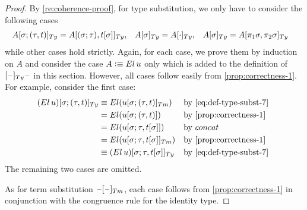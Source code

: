 \documentclass[a4paper,UKenglish,numberwithinsect,cleveref,thm-restate]{lipics-v2021}
\begin{document}
\propCoherence*
\begin{proof}
  By \cref{re:coherence-proof}, for type substitution, we only have to consider the following cases 
  \begin{align*}
    \subTy{A}{\sigma; (\tau, t)}    & = \subTy{A}{(\sigma;\tau), \sub{t}{\sigma}},
                                     & \subTy{A}{\sigma}               & = \subTy{A}{\emptyctx},
                                     & \subTy{A}{\sigma}               & = \subTy{A}{\pi_1\sigma, \pi_2\sigma}
  \end{align*}
  while other cases hold strictly.
  Again, for each case, we prove them by induction on $A$ and consider the case $A \defeq \El\,u$ only which is added to the definition of $[\blank]_{\Ty}\blank$ in this section. 
  However, all cases follow easily from \cref{prop:correctness-1}.
  For example, consider the first case:
  \begin{align*}
    \subTy{(\El\,u)}{\sigma; (\tau, t)} & \judgeq \El(\subTm{u}{\sigma; (\tau, t)}) && \text{by \eqref{eq:def-type-subst-7}} \\
                                      & = \El( \sub{u}{\sigma; (\tau, t)})            && \text{by \cref{prop:correctness-1}} \\
                                      & = \El( \sub{u}{\sigma; \tau, \sub{t}{\sigma}})     && \text{by $\mathsf{concat}$} \\
                                      & = \El( \subTm{u}{\sigma; \tau, \sub{t}{\sigma}}) && \text{by \cref{prop:correctness-1}} \\
                                      & \judgeq \subTy{\left(\El\,u\right)}{\sigma; \tau, \sub{t}{\sigma}} && \text{by \eqref{eq:def-type-subst-7} }
  \end{align*}
  The remaining two cases are omitted.

  As for term substitution $\subTm{\blank}{\blank}$, each case follows from \cref{prop:correctness-1} in conjunction with the congruence rule for the identity type.
\end{proof}
\end{document}
